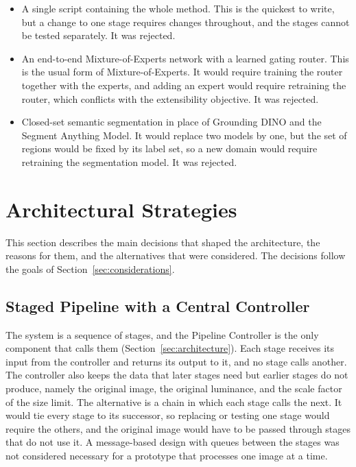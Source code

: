 \documentclass{FastFyp}
\begin{document}
\begin{itemize}
    \item A single script containing the whole method. This is the quickest to write, but a change to one stage requires changes throughout, and the stages cannot be tested separately. It was rejected.
    \item An end-to-end Mixture-of-Experts network with a learned gating router. This is the usual form of Mixture-of-Experts. It would require training the router together with the experts, and adding an expert would require retraining the router, which conflicts with the extensibility objective. It was rejected.
    \item Closed-set semantic segmentation in place of Grounding DINO and the Segment Anything Model. It would replace two models by one, but the set of regions would be fixed by its label set, so a new domain would require retraining the segmentation model. It was rejected.
\end{itemize}

\section{Architectural Strategies}
\label{sec:strategies}

This section describes the main decisions that shaped the architecture, the reasons for them, and the alternatives that were considered. The decisions follow the goals of Section~\ref{sec:considerations}.

\subsection{Staged Pipeline with a Central Controller}

The system is a sequence of stages, and the Pipeline Controller is the only component that calls them (Section~\ref{sec:architecture}). Each stage receives its input from the controller and returns its output to it, and no stage calls another. The controller also keeps the data that later stages need but earlier stages do not produce, namely the original image, the original luminance, and the scale factor of the size limit. The alternative is a chain in which each stage calls the next. It would tie every stage to its successor, so replacing or testing one stage would require the others, and the original image would have to be passed through stages that do not use it. A message-based design with queues between the stages was not considered necessary for a prototype that processes one image at a time.
\end{document}
